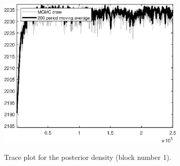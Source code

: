 \begin{figure}[H]
\centering
  \includegraphics[width=0.8\textwidth]{BRS/graphs/TracePlot_Posterior_blck_1}\\
    \caption{Trace plot for the posterior density (block number 1).}
\end{figure}
